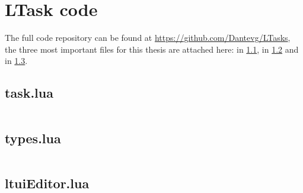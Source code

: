 \chapter{LTask code}\label{appendix-ltask}
The full code repository can be found at \url{https://github.com/Dantevg/LTasks}, the three most important files for this thesis are attached here:  in \ref{appendix-ltask-task.lua},  in \ref{appendix-ltask-types.lua} and  in \ref{appendix-ltask-ltuiEditor.lua}.

\section{task.lua}\label{appendix-ltask-task.lua}
\inputminted[linenos]{lua}{code/task.lua}

\section{types.lua}\label{appendix-ltask-types.lua}
\inputminted[linenos]{lua}{code/types.lua}

\section{ltuiEditor.lua}\label{appendix-ltask-ltuiEditor.lua}
\inputminted[linenos]{lua}{code/ltuiEditor.lua}

